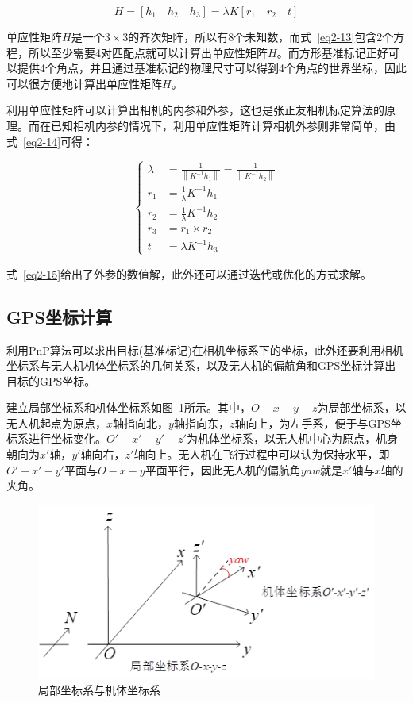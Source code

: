 \begin{equation}\label{eq2-14}
	H = \left[ h_1 \quad h_2 \quad h_3\right] = \lambda K \left[ r_1 \quad r_2 \quad t \right]
\end{equation}

单应性矩阵$H$是一个$3 \times 3$的齐次矩阵，所以有8个未知数，而式~\eqref{eq2-13}包含2个方程，所以至少需要4对匹配点就可以计算出单应性矩阵$H$。而方形基准标记正好可以提供4个角点，并且通过基准标记的物理尺寸可以得到4个角点的世界坐标，因此可以很方便地计算出单应性矩阵$H$。

利用单应性矩阵可以计算出相机的内参和外参，这也是张正友相机标定算法的原理。而在已知相机内参的情况下，利用单应性矩阵计算相机外参则非常简单，由式~\eqref{eq2-14}可得：

\begin{equation}\label{eq2-15}
	\left\{ \begin{aligned}
		\lambda & = \frac{1}{\left\| K^{-1} h_1 \right\|} = \frac{1}{\left\| K^{-1} h_2 \right\|} \\
		r_1 & = \frac{1}{\lambda} K^{-1} h_1 \\
		r_2 & = \frac{1}{\lambda} K^{-1} h_2 \\
		r_3 & = r_1 \times r_2 \\
		t & = \lambda K^{-1} h_3
		\end{aligned}
	\right.
\end{equation}

式~\eqref{eq2-15}给出了外参的数值解，此外还可以通过迭代或优化的方式求解。

\subsection{GPS坐标计算}
利用PnP算法可以求出目标(基准标记)在相机坐标系下的坐标，此外还要利用相机坐标系与无人机机体坐标系的几何关系，以及无人机的偏航角和GPS坐标计算出目标的GPS坐标。

建立局部坐标系和机体坐标系如图~\ref{fig:2-17}所示。其中，$O-x-y-z$为局部坐标系，以无人机起点为原点，$x$轴指向北，$y$轴指向东，$z$轴向上，为左手系，便于与GPS坐标系进行坐标变化。$O'-x'-y'-z'$为机体坐标系，以无人机中心为原点，机身朝向为$x'$轴，$y'$轴向右，$z'$轴向上。无人机在飞行过程中可以认为保持水平，即$O'-x'-y'$平面与$O-x-y$平面平行，因此无人机的偏航角$yaw$就是$x'$轴与$x$轴的夹角。

\begin{figure}[htb]
	\centering
	\includegraphics[width=0.6\linewidth]{figures/2-17.png}
	\caption{局部坐标系与机体坐标系}
	\label{fig:2-17}
\end{figure}

